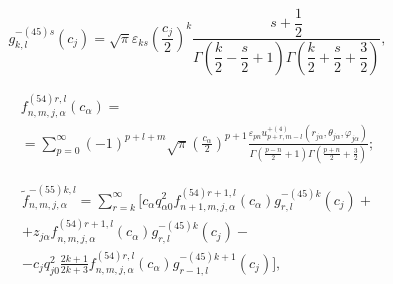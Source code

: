 \begin{russian}
\begin{equation}
g_{k,l}^{ - (45)s}({c_j}) = \sqrt \pi  {\varepsilon _{ks}}{\left( {\dfrac{{{c_j}}}{2}} \right)^k}\dfrac{{s + \dfrac{1}{2}}}{{\Gamma \left( {\dfrac{k}{2} - \dfrac{s}{2} + 1} \right)\Gamma \left( {\dfrac{k}{2} + \dfrac{s}{2} + \dfrac{3}{2}} \right)}},
\label{eq:9:11}
\end{equation}

\begin{multline}
f_{n,m,j,\alpha}^{(54)r,l}({c_\alpha}) = \\
= \sum\limits_{p = 0}^\infty  {{{( - 1)}^{p + l + m}}} \sqrt \pi  {\left( {\frac{{{c_\alpha}}}{2}} \right)^{p + 1}}\frac{{{\varepsilon _{pn}}u_{p + r,m - l}^{ + (4)}\left( {{r_{j\alpha}},{\theta _{j\alpha}},{\varphi _{j\alpha}}} \right)}}{{\Gamma \left( {\frac{{p - n}}{2} + 1} \right)\Gamma \left( {\frac{{p + n}}{2} + \frac{3}{2}} \right)}};
\label{eq:9:12}
\end{multline}

\begin{multline}
\tilde f_{n,m,j,\alpha}^{ - (55)k,l} = \sum\limits_{r = k}^\infty  \bigg[ {c_\alpha}q_{\alpha 0}^2f_{n + 1,m,j,\alpha}^{(54)r + 1,l}({c_\alpha})g_{r,l}^{ - (45)k}({c_j}) + \\ 
+ {z_{j\alpha}}f_{n,m,j,\alpha}^{(54)r + 1,l}({c_\alpha})g_{r,l}^{ - (45)k}({c_j}) - \\
- {c_j}q_{j0}^2\frac{{2k + 1}}{{2k + 3}}f_{n,m,j,\alpha}^{(54)r,l}({c_\alpha})g_{r - 1,l}^{ - (45)k + 1}({c_j}) \bigg],
\label{eq:9:13}
\end{multline}


\end{russian}
